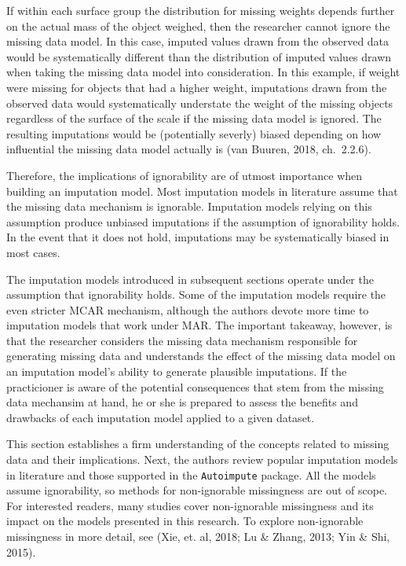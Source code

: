 \documentclass[12pt,oneside]{chicagocapstone}
\begin{document}
If within each surface group the distribution for missing weights
depends further on the actual mass of the object weighed, then the
researcher cannot ignore the missing data model. In this case, imputed
values drawn from the observed data would be systematically different
than the distribution of imputed values drawn when taking the missing
data model into consideration. In this example, if weight were missing
for objects that had a higher weight, imputations drawn from the
observed data would systematically understate the weight of the missing
objects regardless of the surface of the scale if the missing data model
is ignored. The resulting imputations would be (potentially severly)
biased depending on how influential the missing data model actually is
(van Buuren, 2018, ch.~2.2.6).

Therefore, the implications of ignorability are of utmost importance
when building an imputation model. Most imputation models in literature
assume that the missing data mechanism is ignorable. Imputation models
relying on this assumption produce unbiased imputations if the
assumption of ignorability holds. In the event that it does not hold,
imputations may be systematically biased in most cases.

The imputation models introduced in subsequent sections operate under
the assumption that ignorability holds. Some of the imputation models
require the even stricter MCAR mechanism, although the authors devote
more time to imputation models that work under MAR. The important
takeaway, however, is that the researcher considers the missing data
mechanism responsible for generating missing data and understands the
effect of the missing data model on an imputation model's ability to
generate plausible imputations. If the practicioner is aware of the
potential consequences that stem from the missing data mechansim at
hand, he or she is prepared to assess the benefits and drawbacks of each
imputation model applied to a given dataset.

This section establishes a firm understanding of the concepts related to
missing data and their implications. Next, the authors review popular
imputation models in literature and those supported in the
\texttt{Autoimpute} package. All the models assume ignorability, so
methods for non-ignorable missingness are out of scope. For interested
readers, many studies cover non-ignorable missingness and its impact on
the models presented in this research. To explore non-ignorable
missingness in more detail, see (Xie, et. al, 2018; Lu \& Zhang, 2013;
Yin \& Shi, 2015).
\end{document}
